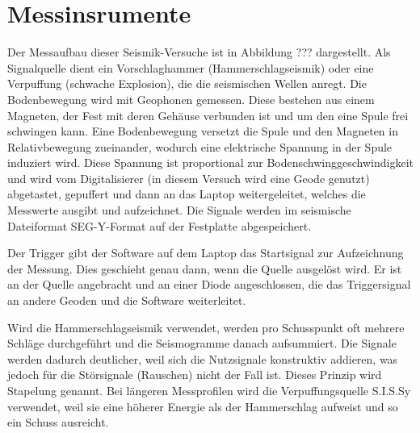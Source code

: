 \section{Messinsrumente}

Der Messaufbau dieser Seismik-Versuche ist in Abbildung ??? dargestellt. Als Signalquelle dient ein Vorschlaghammer (Hammerschlagseismik) oder eine Verpuffung (schwache Explosion), die die seismischen Wellen anregt. Die Bodenbewegung wird mit Geophonen gemessen. Diese bestehen aus einem Magneten, der Fest mit deren Gehäuse verbunden ist und um den eine Spule frei schwingen kann. Eine Bodenbewegung versetzt die Spule und den Magneten in Relativbewegung zueinander, wodurch eine elektrische Spannung in der Spule induziert wird. Diese Spannung ist proportional zur Bodenschwinggeschwindigkeit und wird vom Digitalisierer (in diesem Versuch wird eine Geode genutzt) abgetastet, gepuffert und dann an das Laptop weitergeleitet, welches die Messwerte ausgibt und aufzeichnet. Die Signale werden im seismische Dateiformat SEG-Y-Format auf der Festplatte abgespeichert.

Der Trigger gibt der Software auf dem Laptop das Startsignal zur Aufzeichnung der Messung. Dies geschieht genau dann, wenn die Quelle ausgelöst wird. Er ist an der Quelle angebracht und an einer Diode angeschlossen, die das Triggersignal an andere Geoden und die Software weiterleitet.  

Wird die Hammerschlagseismik verwendet, werden pro Schusspunkt oft mehrere Schläge durchgeführt und die Seismogramme danach aufsummiert. Die Signale werden dadurch deutlicher, weil sich die Nutzsignale konstruktiv addieren, was jedoch für die Störsignale (Rauschen) nicht der Fall ist. Dieses Prinzip wird Stapelung genannt. Bei längeren Messprofilen wird die Verpuffungsquelle S.I.S.Sy verwendet, weil sie eine höherer Energie als der Hammerschlag aufweist und so ein Schuss ausreicht.

